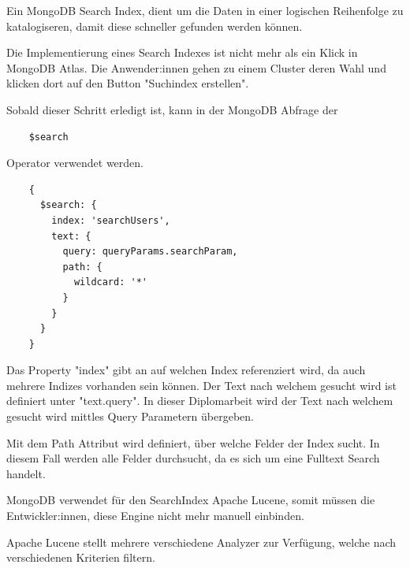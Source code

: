 Ein MongoDB Search Index, dient um die Daten in einer logischen Reihenfolge zu katalogiseren, damit diese schneller gefunden werden können.

Die Implementierung eines Search Indexes ist nicht mehr als ein Klick in MongoDB Atlas. Die Anwender:innen gehen zu einem Cluster deren Wahl und klicken dort auf den Button "Suchindex erstellen".

Sobald dieser Schritt erledigt ist, kann in der MongoDB Abfrage der 

\begin{lstlisting}
    $search 
\end{lstlisting}

Operator verwendet werden.

\begin{lstlisting}
    {
      $search: {
        index: 'searchUsers',
        text: {
          query: queryParams.searchParam,
          path: {
            wildcard: '*'
          }
        }
      }
    }
\end{lstlisting}

Das Property "index" gibt an auf welchen Index referenziert wird, da auch mehrere Indizes vorhanden sein können. 
Der Text nach welchem gesucht wird ist definiert unter "text.query". In dieser Diplomarbeit wird der Text nach welchem gesucht wird mittles Query Parametern übergeben. 

Mit dem Path Attribut wird definiert, über welche Felder der Index sucht. In diesem Fall werden alle Felder durchsucht, da es sich um eine Fulltext Search handelt.

MongoDB verwendet für den SearchIndex Apache Lucene, somit müssen die Entwickler:innen, diese Engine nicht mehr manuell einbinden. 

Apache Lucene stellt mehrere verschiedene Analyzer zur Verfügung, welche nach verschiedenen Kriterien filtern.

